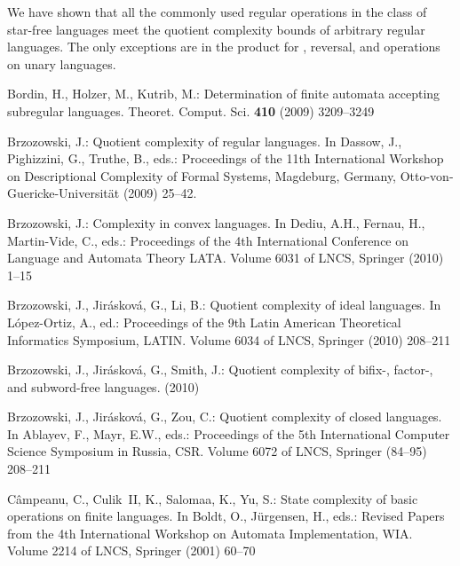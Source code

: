 \documentclass{llncs}
\begin{document}
We have shown that all the commonly used regular operations in the class of star-free languages meet the quotient complexity bounds of arbitrary regular languages. The only exceptions are in the product for , reversal, and operations on unary languages.



\providecommand{\noopsort}[1]{}
\begin{thebibliography}{10}

Bordin, H., Holzer, M., Kutrib, M.:
\newblock Determination of finite automata accepting subregular languages.
\newblock Theoret. Comput. Sci. \textbf{410} (2009)  3209--3249

Brzozowski, J.:
\newblock Quotient complexity of regular languages.
\newblock In Dassow, J., Pighizzini, G., Truthe, B., eds.: Proceedings of the
  11th International Workshop on Descriptional Complexity of Formal Systems,
  Magdeburg, Germany, Otto-von-Guericke-Universit{\"a}t (2009)  25--42.

Brzozowski, J.:
\newblock Complexity in convex languages.
\newblock In Dediu, A.H., Fernau, H., Martin-Vide, C., eds.: Proceedings of the
  4th International Conference on Language and Automata Theory LATA\/.
  Volume 6031 of LNCS, Springer (2010)  1--15

Brzozowski, J., Jir{\'a}skov{\'a}, G., Li, B.:
\newblock Quotient complexity of ideal languages.
\newblock In L\'opez-Ortiz, A., ed.: Proceedings of the 9th Latin American
  Theoretical Informatics Symposium, LATIN\/. Volume 6034 of LNCS,
  Springer (2010)  208--211

Brzozowski, J., Jir\'askov\'a, G., Smith, J.:
\newblock Quotient complexity of bifix-, factor-, and subword-free languages.
 (2010)

Brzozowski, J., Jir{\'a}skov{\'a}, G., Zou, C.:
\newblock Quotient complexity of closed languages.
\newblock In Ablayev, F., Mayr, E.W., eds.: Proceedings of the 5th
  International Computer Science Symposium in Russia, CSR\/. Volume 6072
  of LNCS, Springer (84--95)  208--211

C\^ampeanu, C., Culik~II, K., Salomaa, K., Yu, S.:
\newblock State complexity of basic operations on finite languages.
\newblock In Boldt, O., J{\"u}rgensen, H., eds.: Revised Papers from the 4th
  International Workshop on Automata Implementation, WIA\/. Volume 2214
  of LNCS, Springer (2001)  60--70


\end{thebibliography}
\end{document}
